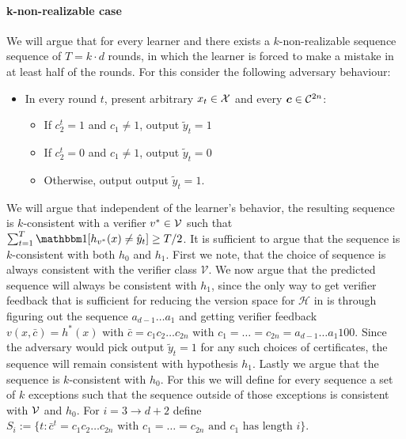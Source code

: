 \documentclass[11pt,letterpaper]{article}
\theoremstyle{definition}
\theoremstyle{plain}
\begin{document}
\paragraph{k-non-realizable case} We will argue that for every learner and there exists a $k$-non-realizable sequence sequence of $T= k\cdot d$ rounds, in which the learner is forced to make a mistake in at least half of the rounds. 
For this consider the following adversary behaviour: 
\begin{itemize}
    \item In every round $t$, present arbitrary $x_t \in {\mathcal X}$ and every $\bm{c} \in {{\mathcal C}}^{2n}$: 
    \begin{itemize}
        \item If $c_2^t = 1$ and $c_1 \neq 1$, output $\tilde{y}_{t} = 1$
        \item If $c_2^t = 0$ and $c_1 \neq 1$, output $\tilde{y}_{t} = 0$
        \item Otherwise, output output $\tilde{y}_{t} = 1$.
    \end{itemize}
\end{itemize}
We will argue that independent of the learner's behavior, the resulting sequence is $k$-consistent with a verifier $v^* \in {\mathcal V}$ such that $\sum_{t=1}^T \indct[h_{v^*}(x) \neq \hat{y}_t] \geq T/2$. 
It is sufficient to argue that the sequence is $k$-consistent with both $h_0$ and $h_1$.
First we note, that the choice of sequence is always consistent with the verifier class $\mathcal{V}$.
We now argue that the predicted sequence will always be consistent with $h_1$, since the only way to get verifier feedback that is sufficient for reducing the version space for $\mathcal{H}$ in  is through figuring out the sequence $a_{d-1} \dots a_1$ and getting verifier feedback $v(x, \bar{c}) = h^* (x) $ with $\bar{c} = c_1c_2 \dots c_{2n}$ with $c_1 = \dots = c_{2n} = a_{d-1} \dots a_1 1 0 0$. Since the adversary would pick output $\tilde{y}_t =1$ for any such choices of certificates, the sequence will remain consistent with hypothesis $h_1$.
Lastly we argue that the sequence is $k$-consistent with $h_0$.
For this we will define for every sequence a set of $k$ exceptions such that the sequence outside of those exceptions is consistent with ${\mathcal V}$ and $h_0$.
For $i = 3 \to d+2$ define $S_i := \{t : \bar{c}^t = c_1c_2 \dots c_{2n} \text{ with } c_1 = \dots = c_{2n} \text{ and } c_1 \text{ has length }i\}$.
\end{document}
